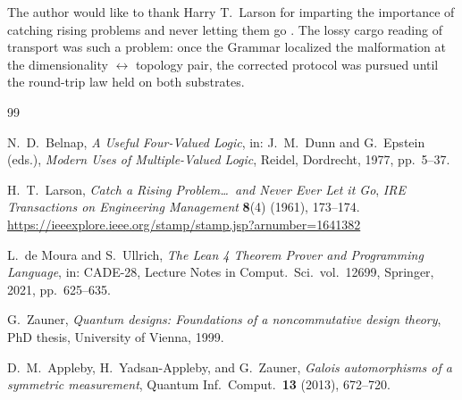 \documentclass[12pt,a4paper]{article}
\begin{document}
The author would like to thank Harry T.\ Larson for imparting the importance
of catching rising problems and never letting them go \cite{Larson1961}.
The lossy cargo reading of transport was such a problem: once the Grammar
localized the malformation at the dimensionality $\leftrightarrow$ topology
pair, the corrected protocol was pursued until the round-trip law held on
both substrates.

\begin{thebibliography}{99}

N.\ D.\ Belnap,
\textit{A Useful Four-Valued Logic},
in: J.\ M.\ Dunn and G.\ Epstein (eds.), \textit{Modern Uses of Multiple-Valued Logic},
Reidel, Dordrecht, 1977, pp.\ 5--37.

H.\ T.\ Larson,
\textit{Catch a Rising Problem\ldots\ and Never Ever Let it Go},
\emph{IRE Transactions on Engineering Management} \textbf{8}(4) (1961), 173--174.
\url{https://ieeexplore.ieee.org/stamp/stamp.jsp?arnumber=1641382}

L.\ de Moura and S.\ Ullrich,
\textit{The Lean 4 Theorem Prover and Programming Language},
in: CADE-28, Lecture Notes in Comput.\ Sci.\ vol.\ 12699, Springer, 2021, pp.\ 625--635.

G.\ Zauner,
\textit{Quantum designs: Foundations of a noncommutative design theory},
PhD thesis, University of Vienna, 1999.

D.\ M.\ Appleby, H.\ Yadsan-Appleby, and G.\ Zauner,
\textit{Galois automorphisms of a symmetric measurement},
Quantum Inf.\ Comput.\ \textbf{13} (2013), 672--720.

\end{thebibliography}
\end{document}

